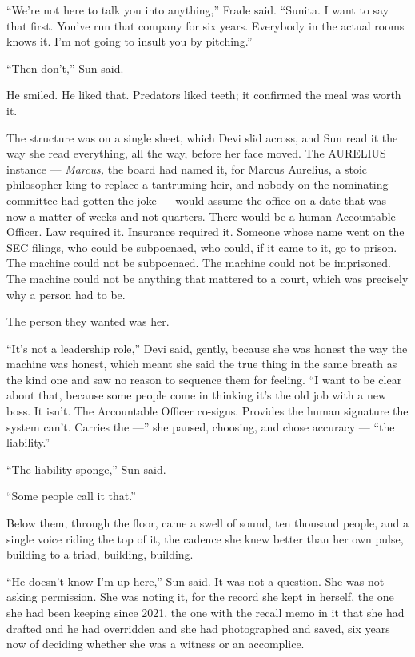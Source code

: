 \documentclass[11pt,openany]{book}
\begin{document}
``We're not here to talk you into anything,'' Frade said. ``Sunita. I want to say that first. You've run that company for six years. Everybody in the actual rooms knows it. I'm not going to insult you by pitching.''

``Then don't,'' Sun said.

He smiled. He liked that. Predators liked teeth; it confirmed the meal was worth it.

The structure was on a single sheet, which Devi slid across, and Sun read it the way she read everything, all the way, before her face moved. The AURELIUS instance --- \textit{Marcus,} the board had named it, for Marcus Aurelius, a stoic philosopher-king to replace a tantruming heir, and nobody on the nominating committee had gotten the joke --- would assume the office on a date that was now a matter of weeks and not quarters. There would be a human Accountable Officer. Law required it. Insurance required it. Someone whose name went on the SEC filings, who could be subpoenaed, who could, if it came to it, go to prison. The machine could not be subpoenaed. The machine could not be imprisoned. The machine could not be anything that mattered to a court, which was precisely why a person had to be.

The person they wanted was her.

``It's not a leadership role,'' Devi said, gently, because she was honest the way the machine was honest, which meant she said the true thing in the same breath as the kind one and saw no reason to sequence them for feeling. ``I want to be clear about that, because some people come in thinking it's the old job with a new boss. It isn't. The Accountable Officer co-signs. Provides the human signature the system can't. Carries the ---'' she paused, choosing, and chose accuracy --- ``the liability.''

``The liability sponge,'' Sun said.

``Some people call it that.''

Below them, through the floor, came a swell of sound, ten thousand people, and a single voice riding the top of it, the cadence she knew better than her own pulse, building to a triad, building, building.

``He doesn't know I'm up here,'' Sun said. It was not a question. She was not asking permission. She was noting it, for the record she kept in herself, the one she had been keeping since 2021, the one with the recall memo in it that she had drafted and he had overridden and she had photographed and saved, six years now of deciding whether she was a witness or an accomplice.
\end{document}
